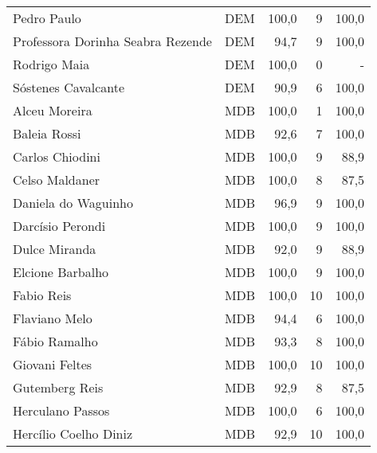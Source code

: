 \begin{longtable}{llrrr}
                         Pedro Paulo &            DEM &     100,0 &            9 &      100,0 \\
   Professora Dorinha Seabra Rezende &            DEM &      94,7 &            9 &      100,0 \\
                        Rodrigo Maia &            DEM &     100,0 &            0 &          - \\
                 Sóstenes Cavalcante &            DEM &      90,9 &            6 &      100,0 \\
                       Alceu Moreira &            MDB &     100,0 &            1 &      100,0 \\
                        Baleia Rossi &            MDB &      92,6 &            7 &      100,0 \\
                     Carlos Chiodini &            MDB &     100,0 &            9 &       88,9 \\
                      Celso Maldaner &            MDB &     100,0 &            8 &       87,5 \\
                 Daniela do Waguinho &            MDB &      96,9 &            9 &      100,0 \\
                    Darcísio Perondi &            MDB &     100,0 &            9 &      100,0 \\
                       Dulce Miranda &            MDB &      92,0 &            9 &       88,9 \\
                    Elcione Barbalho &            MDB &     100,0 &            9 &      100,0 \\
                          Fabio Reis &            MDB &     100,0 &           10 &      100,0 \\
                       Flaviano Melo &            MDB &      94,4 &            6 &      100,0 \\
                       Fábio Ramalho &            MDB &      93,3 &            8 &      100,0 \\
                      Giovani Feltes &            MDB &     100,0 &           10 &      100,0 \\
                      Gutemberg Reis &            MDB &      92,9 &            8 &       87,5 \\
                    Herculano Passos &            MDB &     100,0 &            6 &      100,0 \\
               Hercílio Coelho Diniz &            MDB &      92,9 &           10 &      100,0 \\

\end{longtable}
